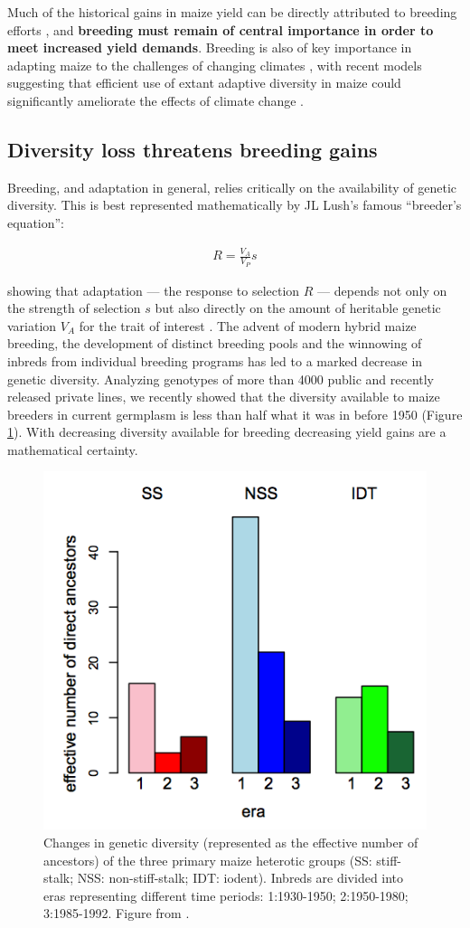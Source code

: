 \documentclass[12pt]{article}
\begin{document}
Much of the historical gains in maize yield can be directly attributed to breeding efforts \citep{Duvick1992, duvick2005genetic}, and \textbf{ breeding must remain of central importance in order to meet increased yield demands}.  
Breeding is also of key importance in adapting maize to the challenges of changing climates \citep{Troyer2004a}, with recent models suggesting that efficient use of extant adaptive diversity in maize could significantly ameliorate the effects of climate change \citep{butler2013adaptation}.   

\subsection*{Diversity loss threatens breeding gains}

Breeding, and adaptation in general, relies critically on the availability of genetic diversity. 
This is best represented mathematically by JL Lush's famous ``breeder's equation'':

\begin{align}
R=\frac{V_A}{V_P}s
\label{eq:lush}
\end{align}

showing that adaptation --- the response to selection $R$ --- depends not only on the strength of selection $s$ but also directly on the amount of heritable genetic variation $V_A$ for the trait of interest \citep{kelly2011breeder}. 
The advent of modern hybrid maize breeding, the development of distinct breeding pools and the winnowing of inbreds from individual breeding programs has led to a marked decrease in genetic diversity. 
Analyzing genotypes of more than 4000 public and recently released private lines, we recently showed that the diversity available to maize breeders in current germplasm is less than half what it was in before 1950 (Figure \ref{fig:diversity}). 
With decreasing diversity available for breeding decreasing yield gains are a mathematical certainty. 

\begin{figure}
\includegraphics[width=0.45\linewidth]{joost_diversity.png}
\caption{Changes in genetic diversity (represented as the effective number of ancestors) of the three primary maize heterotic groups (SS: stiff-stalk; NSS: non-stiff-stalk; IDT: iodent). Inbreds are divided into eras representing different time periods: 1:1930-1950; 2:1950-1980; 3:1985-1992. Figure from \citet{van2012historical}.} 
\label{fig:diversity}
\end{figure}
\end{document}
